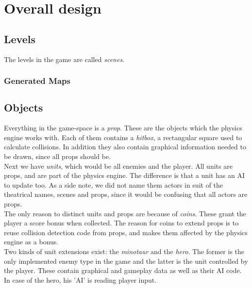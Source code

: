 \chapter{Overall design}

\section{Levels} %
The levels in the game are called \emph{scenes}.
\subsection{Generated Maps}


\section{Objects} %
Everything in the game-space is a \emph{prop}. These are the objects which the physics engine works with. Each of them contains a \emph{hitbox}, a rectangular square used to calculate collisions. In addition they also contain graphical information needed to be drawn, since all props should be.\\
Next we have \emph{units}, which would be all enemies and the player. All units are props, and are part of the physics engine. The difference is that a unit has an AI to update too. As a side note, we did not name them actors in suit of the theatrical names, scenes and props, since it would be confusing that all actors are props.\\
The only reason to distinct units and props are because of \emph{coins}. These grant the player a score bonus when collected. The reason for coins to extend props is to reuse collision detection code from props, and makes them affected by the physics engine as a bonus.\\
Two kinds of unit extensions exist: the \emph{minotaur} and the \emph{hero}. The former is the only implemented enemy type in the game and the latter is the unit controlled by the player. These contain graphical and gameplay data as well as their AI code. In case of the hero, his 'AI' is reading player input.

